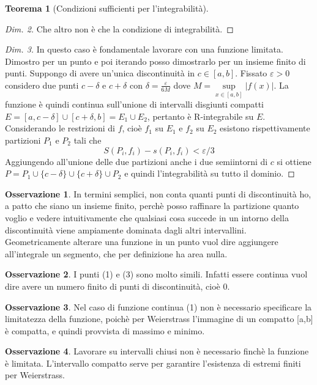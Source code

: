 \documentclass{article}
\theoremstyle{definition}
\newtheorem{theorem}{Teorema}[section]
\theoremstyle{definition}
\theoremstyle{definition}
\theoremstyle{definition}
\newtheorem{remark}{Osservazione}[section]
\theoremstyle{definition}
\begin{document}
\begin{theorem}[Condizioni sufficienti per l'integrabilità]
\begin{proof}[Dim. 2]
        Che altro non è che la condizione di integrabilità.
    \end{proof}
    \begin{proof}[Dim. 3]
        In questo caso è fondamentale lavorare con una funzione limitata. Dimostro per un punto e poi iterando posso dimostrarlo per un insieme finito di punti. Suppongo di avere un'unica discontinuità in $c \in [a,b]$. Fissato $\varepsilon>0$ considero due punti $c-\delta$ e $c+\delta$ con $\delta = \frac{\varepsilon}{6M}$ dove $M=\underset{x\in[a,b]}\sup |f(x)|$. La funzione è quindi continua sull'unione di intervalli disgiunti compatti $E=[a,c-\delta]\cup [c+\delta,b] = E_1 \cup E_2$, pertanto è R-integrabile su $E$. Considerando le restrizioni di $f$, cioè $f_1$ su $E_1$ e $f_2$ su $E_2$ esistono rispettivamente partizioni $P_1$ e $P_2$ tali che 
        \[
            S(P_i,f_i) - s(P_i,f_i) < \varepsilon/3        
        \]
        Aggiungendo all'unione delle due partizioni anche i due semiintorni di $c$ si ottiene $P=P_1 \cup \lbrace c-\delta \rbrace \cup \lbrace c+\delta \rbrace \cup P_2$ e quindi l'integrabilità su tutto il dominio.
        \end{proof}
\end{theorem}

\begin{remark}
    In termini semplici, non conta quanti punti di discontinuità ho, a patto che siano un insieme finito, perchè posso raffinare la partizione quanto voglio e vedere intuitivamente che qualsiasi cosa succede in un intorno della discontinuità viene ampiamente dominata dagli altri intervallini. Geometricamente alterare una funzione in un punto vuol dire aggiungere all'integrale un segmento, che per definizione ha area nulla.
\end{remark}
\begin{remark}
    I punti (1) e (3) sono molto simili. Infatti essere continua vuol dire avere un numero finito di punti di discontinuità, cioè 0.
\end{remark}

\begin{remark}
    Nel caso di funzione continua (1) non è necessario specificare la limitatezza della funzione, poichè per Weierstrass l'immagine di un compatto [a,b] è compatta, e quindi provvista di massimo e minimo.
\end{remark}

\begin{remark}
    Lavorare su intervalli chiusi non è necessario finchè la funzione è limitata. L'intervallo compatto serve per garantire l'esistenza di estremi finiti per Weierstrass.
\end{remark}
\end{document}
